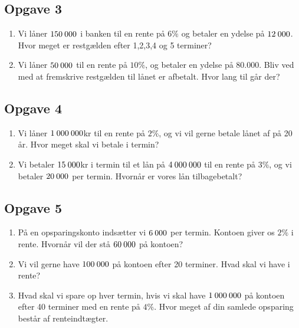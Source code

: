 \documentclass[12pt]{article}
\begin{document}
\subsection*{Opgave 3}
\begin{enumerate}[label=\roman*)]
\item Vi låner $150 \hspace{0.8mm}000$ i banken til en rente på $6\%$ og betaler en ydelse på $12 \hspace{0.8mm} 000$. Hvor meget er restgælden efter 1,2,3,4 og 5 terminer?
\item Vi låner $50 \hspace{0.8mm} 000$ til en rente på $10\%$, og betaler en ydelse på 80.000. Bliv ved med at fremskrive restgælden til lånet er afbetalt. Hvor lang til går der?
\end{enumerate}

\subsection*{Opgave 4}
\begin{enumerate}[label=\roman*)]
\item Vi låner $1\hspace{0.8mm} 000 \hspace{0.8mm} 000 $kr til en rente på $2\%$, og vi vil gerne betale lånet af på 20 år. Hvor meget skal vi betale i termin?
\item Vi betaler $15 \hspace{0.8mm} 000$kr i termin til et lån på $4\hspace{0.8mm} 000 \hspace{0.8mm} 000$ til en rente på $3\%$, og vi betaler $20 \hspace{0.8mm} 000$ per termin. Hvornår er vores lån tilbagebetalt?
\end{enumerate}

\subsection*{Opgave 5}
\begin{enumerate}[label=\roman*)]
	\item På en opsparingskonto indsætter vi $6 \hspace{0.8mm} 000$ per termin. Kontoen giver os $2\%$ i rente. Hvornår
	vil der stå $60 \hspace{0.8mm} 000$ på kontoen?
	\item Vi vil gerne have $100 \hspace{0.8mm} 000$ på kontoen efter 20 terminer. Hvad skal vi have i rente?
	\item Hvad skal vi spare op hver termin, hvis vi skal have $1\hspace{0.8mm} 000 \hspace{0.8mm} 000$ på kontoen efter 40 terminer 
	med en rente på $4\%$. Hvor meget af din samlede opsparing består af renteindtægter.
\end{enumerate}
\end{document}
